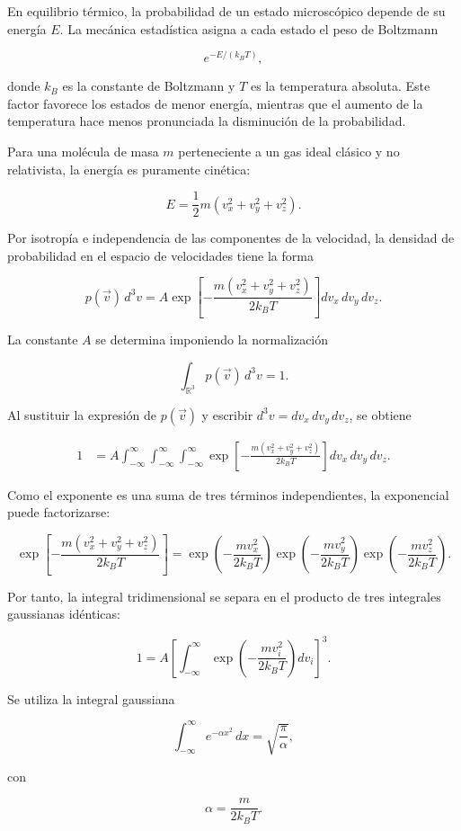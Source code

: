 En equilibrio térmico, la probabilidad de un estado microscópico depende de
su energía $E$. La mecánica estadística asigna a cada estado el peso de
Boltzmann

$$
e^{-E/(k_BT)},
$$

donde $k_B$ es la constante de Boltzmann y $T$ es la temperatura absoluta.
Este factor favorece los estados de menor energía, mientras que el aumento de
la temperatura hace menos pronunciada la disminución de la probabilidad.

Para una molécula de masa $m$ perteneciente a un gas ideal clásico y no
relativista, la energía es puramente cinética:

$$
E=\frac{1}{2}m\left(v_x^2+v_y^2+v_z^2\right).
$$

Por isotropía e independencia de las componentes de la velocidad, la densidad
de probabilidad en el espacio de velocidades tiene la forma

$$
p(\vec{v})\,d^3v
=A\exp\left[-\frac{m(v_x^2+v_y^2+v_z^2)}{2k_BT}\right]
dv_x\,dv_y\,dv_z.
$$

La constante $A$ se determina imponiendo la normalización

$$
\int_{\mathbb{R}^3}p(\vec{v})\,d^3v=1.
$$

Al sustituir la expresión de $p(\vec{v})$ y escribir
$d^3v=dv_x\,dv_y\,dv_z$, se obtiene

$$
\begin{aligned}
1
&=A\int_{-\infty}^{\infty}
\int_{-\infty}^{\infty}
\int_{-\infty}^{\infty}
\exp\left[-\frac{m(v_x^2+v_y^2+v_z^2)}{2k_BT}\right]
dv_x\,dv_y\,dv_z.
\end{aligned}
$$

Como el exponente es una suma de tres términos independientes, la exponencial
puede factorizarse:

$$
\exp\left[-\frac{m(v_x^2+v_y^2+v_z^2)}{2k_BT}\right]
=\exp\left(-\frac{mv_x^2}{2k_BT}\right)
 \exp\left(-\frac{mv_y^2}{2k_BT}\right)
 \exp\left(-\frac{mv_z^2}{2k_BT}\right).
$$

Por tanto, la integral tridimensional se separa en el producto de tres
integrales gaussianas idénticas:

$$
1
=A\left[
\int_{-\infty}^{\infty}
\exp\left(-\frac{mv_i^2}{2k_BT}\right)dv_i
\right]^3.
$$

Se utiliza la integral gaussiana

$$
\int_{-\infty}^{\infty}e^{-\alpha x^2}\,dx
=\sqrt{\frac{\pi}{\alpha}},
$$

con

$$
\alpha=\frac{m}{2k_BT}.
$$

